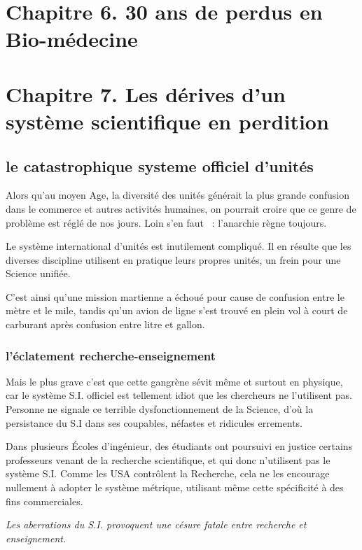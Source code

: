 \documentclass[a4paper,12pt]{article}
\begin{document}
\section{Chapitre 6. 30 ans de perdus en Bio-médecine}


\section{Chapitre 7. Les dérives d'un système scientifique en perdition}
\subsection {le catastrophique systeme officiel d'unités}

 Alors qu'au moyen Age, la diversité des unités générait la plus grande confusion dans le commerce et autres activités humaines, on pourrait croire que ce genre de problème est réglé de nos jours. Loin s'en faut   : l'anarchie règne toujours.
 

Le système international d'unités est inutilement compliqué. Il en résulte que les diverses discipline utilisent en pratique leurs propres unités, un frein pour  une Science unifiée. 


C'est ainsi qu'une mission martienne a échoué pour cause de confusion entre le mètre et le mile, tandis qu'un avion de ligne s'est trouvé en plein vol à court de carburant après confusion entre litre et gallon.

\subsubsection{l'éclatement recherche-enseignement}

Mais le plus grave c'est que cette gangrène sévit même et surtout en physique, car le système S.I. officiel est tellement idiot que les chercheurs ne l'utilisent pas. Personne ne signale ce terrible dysfonctionnement de la Science, d'où la persistance du S.I dans ses coupables, néfastes et ridicules errements.


Dans plusieurs Écoles d'ingénieur, des étudiants ont poursuivi en justice certains professeurs venant de la recherche scientifique, et qui donc n'utilisent pas le système S.I. Comme les USA contrôlent la Recherche, cela ne les encourage nullement à adopter le système métrique, utilisant même cette spécificité à des fins commerciales.


\textit{Les aberrations du S.I. provoquent une césure fatale entre recherche et enseignement.}
\end{document}
